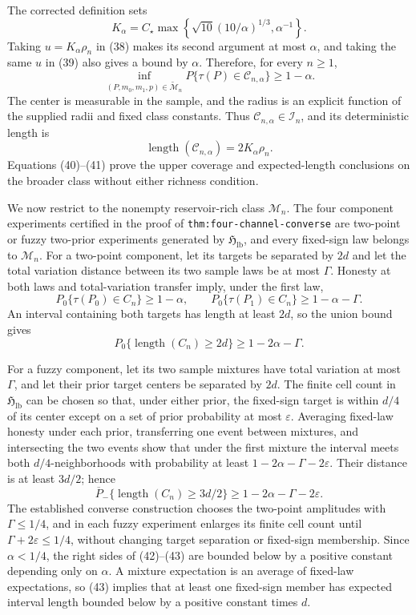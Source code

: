 The corrected definition sets
\[
K_\alpha=C_\star\max\!\left\{
\sqrt{10}(10/\alpha)^{1/3},\alpha^{-1}\right\}.
\]
Taking \(u=K_\alpha\rho_n\) in (38) makes its second argument at most
\(\alpha\), and taking the same \(u\) in (39) also gives a bound by
\(\alpha\).  Therefore, for every \(n\geq1\),
\[
\inf_{(P,m_0,m_1,p)\in\widetilde{\mathcal M}_n}
P\{\tau(P)\in\mathcal C_{n,\alpha}\}\geq1-\alpha.                 \tag{40}
\]
The center is measurable in the sample, and the radius is an explicit function
of the supplied radii and fixed class constants.  Thus
\(\mathcal C_{n,\alpha}\in\mathcal I_n\), and its deterministic length is
\[
\operatorname{length}(\mathcal C_{n,\alpha})
=2K_\alpha\rho_n.                                                  \tag{41}
\]
Equations (40)--(41) prove the upper coverage and expected-length conclusions
on the broader class without either richness condition.

We now restrict to the nonempty reservoir-rich class \(\mathcal M_n\).  The
four component experiments certified in the proof of
\texttt{thm:four-channel-converse} are two-point or fuzzy two-prior
experiments generated by \(\mathfrak H_{\mathrm{lb}}\), and every fixed-sign
law belongs to \(\mathcal M_n\).  For a two-point component, let its targets
be separated by \(2d\) and let the total variation distance between its two
sample laws be at most \(\Gamma\).  Honesty at both laws and total-variation
transfer imply, under the first law,
\[
P_0\{\tau(P_0)\in C_n\}\geq1-\alpha,
\qquad
P_0\{\tau(P_1)\in C_n\}\geq1-\alpha-\Gamma.
\]
An interval containing both targets has length at least \(2d\), so the union
bound gives
\[
P_0\{\operatorname{length}(C_n)\geq2d\}
\geq1-2\alpha-\Gamma.                                              \tag{42}
\]

For a fuzzy component, let its two sample mixtures have total variation at
most \(\Gamma\), and let their prior target centers be separated by \(2d\).
The finite cell count in \(\mathfrak H_{\mathrm{lb}}\) can be chosen so that,
under either prior, the fixed-sign target is within \(d/4\) of its center
except on a set of prior probability at most \(\varepsilon\).  Averaging
fixed-law honesty under each prior, transferring one event between mixtures,
and intersecting the two events show that under the first mixture the interval
meets both \(d/4\)-neighborhoods with probability at least
\(1-2\alpha-\Gamma-2\varepsilon\).  Their distance is at least \(3d/2\);
hence
\[
\overline P_-
\{\operatorname{length}(C_n)\geq3d/2\}
\geq1-2\alpha-\Gamma-2\varepsilon.                                 \tag{43}
\]
The established converse construction chooses the two-point amplitudes with
\(\Gamma\leq1/4\), and in each fuzzy experiment enlarges its finite cell count
until \(\Gamma+2\varepsilon\leq1/4\), without changing target separation or
fixed-sign membership.  Since \(\alpha<1/4\), the right sides of (42)--(43)
are bounded below by a positive constant depending only on \(\alpha\).  A
mixture expectation is an average of fixed-law expectations, so (43) implies
that at least one fixed-sign member has expected interval length bounded below
by a positive constant times \(d\).

